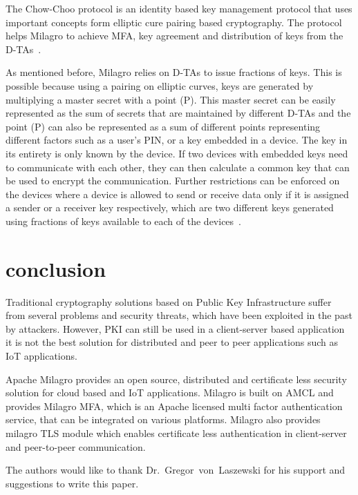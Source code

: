 The Chow-Choo protocol is an identity based key management protocol
that uses important concepts form elliptic cure pairing based
cryptography. The protocol helps Milagro to achieve MFA, key agreement
and distribution of keys from the
D-TAs~\cite{hid-sp18-503-milagro-protocols}.


As mentioned before, Milagro relies on D-TAs to issue fractions of
keys. This is possible because using a pairing on elliptic curves,
keys are generated by multiplying a master secret with a point
(P). This master secret can be easily represented as the sum of
secrets that are maintained by different D-TAs and the point (P) can
also be represented as a sum of different points representing
different factors such as a user's PIN, or a key embedded in a
device. The key in its entirety is only known by the device. If two
devices with embedded keys need to communicate with each other, they
can then calculate a common key that can be used to encrypt the
communication. Further restrictions can be enforced on the devices
where a device is allowed to send or receive data only if it is
assigned a sender or a receiver key respectively, which are two
different keys generated using fractions of keys available to each of
the devices~\cite{hid-sp18-503-milagro-protocols}.

\section{conclusion}
Traditional cryptography solutions based on Public Key Infrastructure
suffer from several problems and security threats, which have been
exploited in the past by attackers. However, PKI can still be used in
a client-server based application it is not the best solution for
distributed and peer to peer applications such as IoT applications.

Apache Milagro provides an open source, distributed and certificate
less security solution for cloud based and IoT applications. Milagro
is built on AMCL and provides Milagro MFA, which is an Apache licensed
multi factor authentication service, that can be integrated on various
platforms. Milagro also provides milagro TLS module which enables
certificate less authentication in client-server and peer-to-peer
communication.

\begin{acks}

  The authors would like to thank Dr.~Gregor~von~Laszewski for his
  support and suggestions to write this paper.

\end{acks}




 
